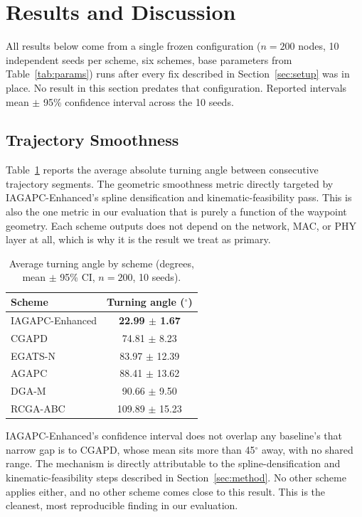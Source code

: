 \documentclass[runningheads]{llncs}
\begin{document}
\section{Results and Discussion}
\label{sec:results}

All results below come from a single frozen configuration ($n{=}200$
nodes, 10 independent seeds per scheme, six schemes, base parameters from
Table~\ref{tab:params}) runs after every fix described in
Section~\ref{sec:setup} was in place. No result in this section predates
that configuration. Reported intervals mean $\pm$ 95\% confidence
interval across the 10 seeds.

\subsection{Trajectory Smoothness}

Table~\ref{tab:turning} reports the average absolute turning angle between
consecutive trajectory segments. The geometric smoothness metric
directly targeted by IAGAPC-Enhanced's spline densification and
kinematic-feasibility pass. This is also the one metric in our evaluation
that is purely a function of the waypoint geometry. Each scheme outputs does not depend on the network, MAC, or PHY layer at all, which is why it
is the result we treat as primary.

\begin{table}[t]
\centering
\caption{Average turning angle by scheme (degrees, mean $\pm$ 95\% CI, $n{=}200$, 10 seeds).}
\label{tab:turning}
\begin{tabular}{lc}
\toprule
Scheme & Turning angle ($^\circ$) \\
\midrule
IAGAPC-Enhanced & \textbf{22.99 $\pm$ 1.67} \\
CGAPD & 74.81 $\pm$ 8.23 \\
EGATS-N & 83.97 $\pm$ 12.39 \\
AGAPC & 88.41 $\pm$ 13.62 \\
DGA-M & 90.66 $\pm$ 9.50 \\
RCGA-ABC & 109.89 $\pm$ 15.23 \\
\bottomrule
\end{tabular}
\end{table}

IAGAPC-Enhanced's confidence interval does not overlap any baseline's that narrow gap is to CGAPD, whose mean sits more than 45$^\circ$ away, with
no shared range.
The mechanism is directly attributable to the spline-densification and
kinematic-feasibility steps described in Section~\ref{sec:method}. No
other scheme applies either, and no other scheme comes close to this
result. This is the cleanest, most reproducible finding in our evaluation.
\end{document}
